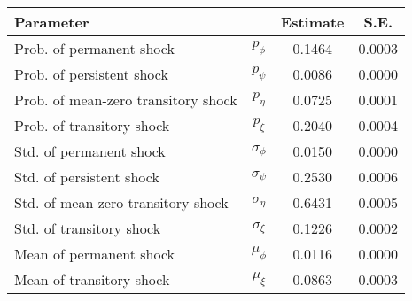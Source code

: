 \begin{tabular}{lccc} 
\toprule 
Parameter & & Estimate & S.E. \\ 
\midrule 
Prob. of permanent shock & $p_{\phi}$ &  0.1464 &  0.0003 \\ 
Prob. of persistent shock & $p_{\psi}$ &  0.0086 &  0.0000 \\ 
Prob. of mean-zero transitory shock & $p_{\eta}$ &  0.0725 &  0.0001 \\ 
Prob. of transitory shock & $p_{\xi}$ &  0.2040 &  0.0004 \\ 
Std. of permanent shock & $\sigma_{\phi}$ &  0.0150 &  0.0000 \\ 
Std. of persistent shock & $\sigma_{\psi}$ &  0.2530 &  0.0006 \\ 
Std. of mean-zero transitory shock & $\sigma_{\eta}$ &  0.6431 &  0.0005 \\ 
Std. of transitory shock & $\sigma_{\xi}$ &  0.1226 &  0.0002 \\ 
Mean of permanent shock & $\mu_{\phi}$ &  0.0116 &  0.0000 \\ 
Mean of transitory shock & $\mu_{\xi}$ &  0.0863 &  0.0003 \\ 
\bottomrule
\end{tabular}
